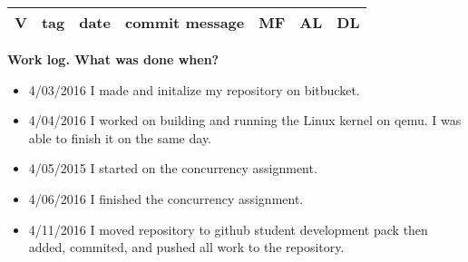 \documentclass[draftclsnofoot,onecolumn,letterpaper,10pt,titlepage]{IEEEtran}
\begin{document}
\bigskip

\noindent
\begin{tabular}{|rllp{7.5cm}rrr|}
\hline \multicolumn{1}{|c}{\textbf{V}} & \multicolumn{1}{c}{\textbf{tag}}
& \multicolumn{1}{c}{\textbf{date}}
& \multicolumn{1}{c}{\textbf{commit message}} & \multicolumn{1}{c}{\textbf{MF}}
& \multicolumn{1}{c}{\textbf{AL}} & \multicolumn{1}{c|}{\textbf{DL}} \\ \hline

\hline
\end{tabular}

\textbf{Work log. What was done when?}
\begin{itemize}
\item 4/03/2016 I made and initalize my repository on bitbucket.
\item 4/04/2016 I worked on building and running the Linux kernel on qemu. I was able to finish it on the same day.
\item 4/05/2015 I started on the concurrency assignment.
\item 4/06/2016 I finished the concurrency assignment.
\item 4/11/2016 I moved repository to github student development pack then added, commited, and pushed all work to the repository.
\end{itemize}
  
\nocite{*}

\end{document}
